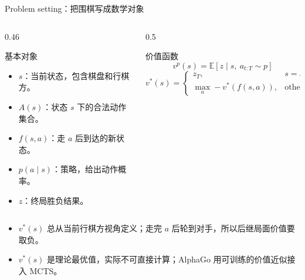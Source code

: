 \documentclass[UTF8,aspectratio=169,10pt]{ctexbeamer}
\begin{document}
\begin{frame}{Problem setting：把围棋写成数学对象}
  \begin{columns}[T,onlytextwidth]
    \begin{column}{0.46\textwidth}
      \begin{block}{基本对象}
        \begin{itemize}
          \item $s$：当前状态，包含棋盘和行棋方。
          \item $A(s)$：状态 $s$ 下的合法动作集合。
          \item $f(s,a)$：走 $a$ 后到达的新状态。
          \item $p(a\mid s)$：策略，给出动作概率。
          \item $z$：终局胜负结果。
        \end{itemize}
      \end{block}
    \end{column}
    \begin{column}{0.5\textwidth}
      \begin{block}{价值函数}
        \[
          v^p(s)=\mathbb{E}[z\mid s,\ a_{t:T}\sim p]
        \]
        \[
          v^*(s)=
          \begin{cases}
            z_T, & s=s_T\\
            \max_a -v^*(f(s,a)), & \text{otherwise}
          \end{cases}
        \]
      \end{block}
    \end{column}
  \end{columns}

  \vspace{0.18cm}
  \begin{itemize}
    \item $v^*(s)$ 总从当前行棋方视角定义；走完 $a$ 后轮到对手，所以后继局面价值要取负。
    \item $v^*(s)$ 是理论最优值，实际不可直接计算；AlphaGo 用可训练的价值近似接入 MCTS。
  \end{itemize}
\end{frame}
\end{document}
